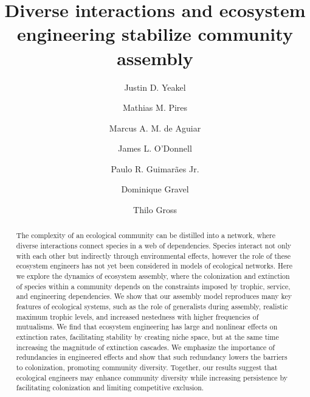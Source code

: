 \documentclass[twocolumn,preprintnumbers,amsmath,amssymb,superscriptaddress,linenumbers]{revtex4-1}
\begin{document}
\title{Diverse interactions and ecosystem engineering stabilize community assembly} %



\author{Justin D. Yeakel}  

\author{Mathias M. Pires} 

\author{Marcus A. M. de Aguiar} 

\author{James L. O'Donnell} 

\author{Paulo R. Guimar\~aes Jr.} 

\author{Dominique Gravel} 

\author{Thilo Gross} 

\begin{abstract}
  The complexity of an ecological community can be distilled into a network, where diverse interactions connect species in a web of dependencies. Species interact not only with each other but indirectly through environmental effects, however the role of these ecosystem engineers has not yet been considered in models of ecological networks. Here we explore the dynamics of ecosystem assembly, where the colonization and extinction of species within a community depends on the constraints imposed by trophic, service, and engineering dependencies. We show that our assembly model reproduces many key features of ecological systems, such as the role of generalists during assembly, realistic maximum trophic levels, and increased nestedness with higher frequencies of mutualisms. We find that ecosystem engineering has large and nonlinear effects on extinction rates, facilitating stability by creating niche space, but at the same time increasing the magnitude of extinction cascades. We emphasize the importance of redundancies in engineered effects and show that such redundancy lowers the barriers to colonization, promoting community diversity. Together, our results suggest that ecological engineers may enhance community diversity while increasing persistence by facilitating colonization and limiting competitive exclusion. 
\end{abstract}
\end{document}
